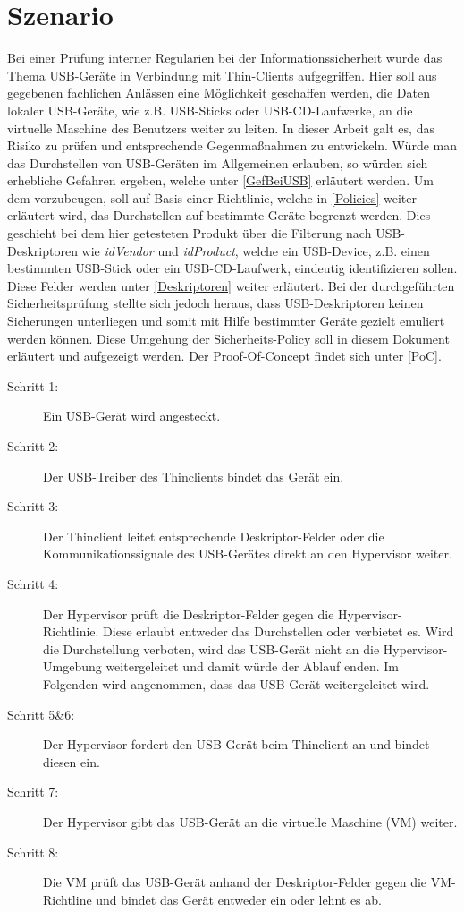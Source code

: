 \chapter{Szenario}
Bei einer Prüfung interner Regularien bei der Informationssicherheit wurde das Thema USB-Geräte in Verbindung mit Thin-Clients aufgegriffen. Hier soll aus gegebenen fachlichen Anlässen eine Möglichkeit geschaffen werden, die Daten lokaler USB-Geräte, wie z.B. USB-Sticks oder USB-CD-Laufwerke, an die virtuelle Maschine des Benutzers weiter zu leiten. In dieser Arbeit galt es, das Risiko zu prüfen und entsprechende Gegenmaßnahmen zu entwickeln.
Würde man das Durchstellen von USB-Geräten im Allgemeinen erlauben, so würden sich erhebliche Gefahren ergeben, welche unter \ref{GefBeiUSB} erläutert werden. Um dem vorzubeugen, soll auf Basis einer Richtlinie, welche in \ref{Policies} weiter erläutert wird, das Durchstellen auf bestimmte Geräte begrenzt werden. Dies geschieht bei dem hier getesteten Produkt über die Filterung nach USB-Deskriptoren wie \textit{idVendor} und \textit{idProduct}, welche ein USB-Device, z.B. einen bestimmten USB-Stick oder ein USB-CD-Laufwerk, eindeutig identifizieren sollen. Diese Felder werden unter \ref{Deskriptoren} weiter erläutert.
Bei der durchgeführten Sicherheitsprüfung stellte sich jedoch heraus, dass USB-Deskriptoren keinen Sicherungen unterliegen und somit mit Hilfe bestimmter Geräte gezielt emuliert werden können. Diese Umgehung der Sicherheits-Policy soll in diesem Dokument erläutert und aufgezeigt werden. Der Proof-Of-Concept findet sich unter \ref{PoC}.



\begin{description}
	\item[Schritt 1: ] Ein USB-Gerät wird angesteckt.
	\item[Schritt 2: ] Der USB-Treiber des Thinclients bindet das Gerät ein.
	\item[Schritt 3: ] Der Thinclient leitet entsprechende Deskriptor-Felder oder die Kommunikationssignale des USB-Gerätes direkt an den Hypervisor weiter. 
	\item[Schritt 4: ] Der Hypervisor prüft die Deskriptor-Felder gegen die Hypervisor-Richtlinie. Diese erlaubt entweder das Durchstellen oder verbietet es. Wird die Durchstellung verboten, wird das USB-Gerät nicht an die Hypervisor-Umgebung weitergeleitet und damit würde der Ablauf enden. Im Folgenden wird angenommen, dass das USB-Gerät weitergeleitet wird.
	\item[Schritt 5\&6: ] Der Hypervisor fordert den USB-Gerät beim Thinclient an und bindet diesen ein.
	\item[Schritt 7: ] Der Hypervisor gibt das USB-Gerät an die virtuelle Maschine (VM) weiter.
	\item[Schritt 8: ] Die VM prüft das USB-Gerät anhand der Deskriptor-Felder gegen die VM-Richtline und bindet das Gerät entweder ein oder lehnt es ab.
\end{description}